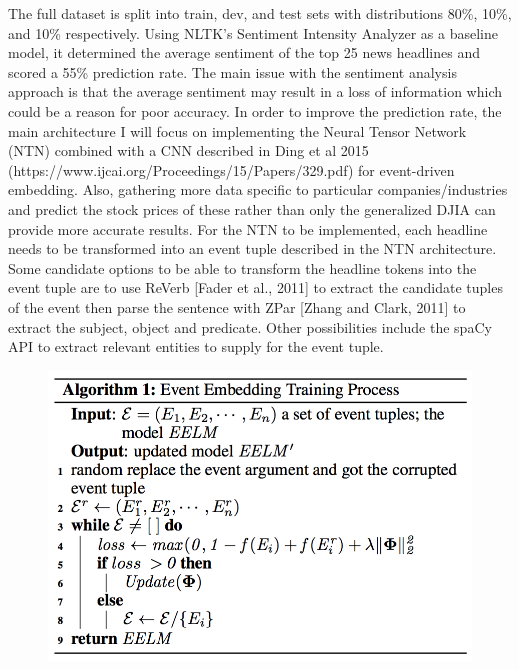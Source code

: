 \documentclass{article} %
\begin{document}
The full dataset is split into train, dev, and test sets with distributions 80\%, 10\%, and 10\% respectively.
Using NLTK's Sentiment Intensity Analyzer as a baseline model, it determined the average sentiment of the top 25 news headlines and scored a 55\% prediction rate. 
The main issue with the sentiment analysis approach is that the average sentiment may result in a loss of information which could be a reason for poor accuracy.
In order to improve the prediction rate, the main architecture I will focus on implementing the Neural Tensor Network (NTN) combined with a CNN described in Ding et al 2015 (https://www.ijcai.org/Proceedings/15/Papers/329.pdf) for event-driven embedding.
Also, gathering more data specific to particular companies/industries and predict the stock prices of these rather than only the generalized DJIA can provide more accurate results.
For the NTN to be implemented, each headline needs to be transformed into an event tuple described in the NTN architecture.
Some candidate options to be able to transform the headline tokens into the event tuple are to use
ReVerb [Fader et al., 2011]
to extract the candidate tuples of the event then parse the sentence with ZPar [Zhang and Clark, 2011] to
extract the subject, object and predicate.
Other possibilities include the spaCy API to extract relevant entities to supply for the event tuple.

\begin{figure}%
  \hspace*{-1cm}%
  \includegraphics[scale=0.5]{img/algo1}
  \hspace*{-1cm}%
\end{figure}

\pagebreak
\end{document}
